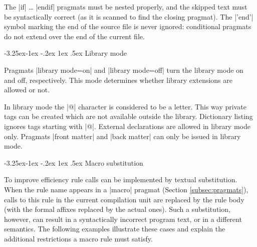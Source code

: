 \documentclass[titlepage]{article}
\makeatletter
\renewcommand\subsection{%
\@startsection{subsection}{2}{\z@}%
   {-3.25ex\@plus -1ex \@minus -.2ex}%
   {1ex \@plus .5ex}%
   {\normalfont\normalsize\bfseries}}
\makeatother
\begin{document}
The \pp|if| \dots{} \pp|endif| pragmats must be nested properly, and the
skipped text must be syntactically correct (as it is scanned to find the
closing pragmat). The \pp|'end'| symbol marking the end of the source file
is never ignored: conditional pragmats do not extend over the end of the
current file.


\subsection{Library mode}\label{subsec:library}

Pragmats \pp|library mode=on| and \pp|library mode=off| turn the library
mode on and off, respectively. This mode determines whether library
extensions are allowed or not.

In library mode the \pp|@| character is considered to be a letter. This way
private tags can be created which are not available outside the library.
Dictionary listing ignores tags starting with \pp|@|.
External declarations are allowed in library mode only.
Pragmats \pp|front matter| and \pp|back matter| can only be issued in library
mode.



\subsection{Macro substitution}\label{sec:macro}

To improve efficiency rule calls can be implemented by textual substitution.
When the rule name appears in a \pp|macro| pragmat (Section
\ref{subsec:pragmats}), calls to this rule in the current compilation unit
are replaced by the rule body (with the formal affixes replaced by the
actual ones). Such a substitution, however, can result in a syntactically incorrect
program text, or in a different semantics. The following examples illustrate
these cases and explain the additional restrictions a macro rule must
satisfy.

\def\becomes{$\Rightarrow$\space}
\end{document}
